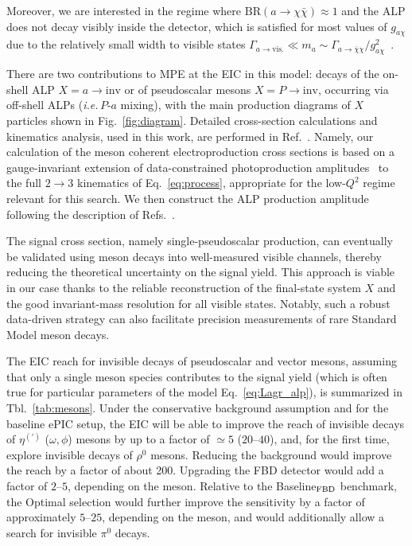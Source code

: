 \documentclass[aps,prd,preprintnumbers,superscriptaddress,nofootinbib,floatfix,twocolumn,notitlepage,reprint]{revtex4-2}
\newcommand{\BR}{\mathrm{BR}}
\newcommand{\ie}{\textit{i.e.}}
\begin{document}
Moreover, we are interested in the regime where $\BR(a \to \chi\bar{\chi})\approx 1$ and the ALP does not decay visibly inside the detector, which is satisfied for most values of $g_{a\chi}$ due to the relatively small width to visible states $\Gamma_{a\to\text{vis.}}\ll m_a\sim  \Gamma_{a\to\bar{\chi} \chi}/g_{a\chi}^2$~\cite{Aloni:2018vki,Ovchynnikov:2025gpx,Balkin:2025enj}.

There are two contributions to MPE at the EIC in this model: 
decays of the on-shell ALP $X = a\to \text{inv}$ or of pseudoscalar mesons $X = P\to \text{inv}$, occurring via off-shell ALPs (\ie $\, P$-$a$ mixing), with the main production diagrams of $X$ particles shown in Fig.~\ref{fig:diagram}. 
Detailed cross-section calculations and kinematics analysis, used in this work, are performed in Ref.~\cite{Balkin:2026whv}. Namely, our calculation of the meson coherent electroproduction cross sections is based on a gauge-invariant extension of data-constrained photoproduction amplitudes~\cite{Yu:2016zut,Yu:2017vvp,Kashevarov:2017vyl,Wang:2025rvr} to the full $2\to3$ kinematics of Eq.~\eqref{eq:process}, appropriate for the low-$Q^2$ regime relevant for this search. We then construct the ALP production amplitude following the description of Refs.~\cite{Aloni:2018vki,Ovchynnikov:2025gpx,Balkin:2025enj}. 

The signal cross section, namely single-pseudoscalar production, can eventually be validated using meson decays into well-measured visible channels, thereby reducing the theoretical uncertainty on the signal yield. 
This approach is viable in our case thanks to the reliable reconstruction of the final-state system $X$ and the good invariant-mass resolution for all visible states. 
Notably, such a robust data-driven strategy can also facilitate precision measurements of rare Standard Model meson decays.

The EIC reach for invisible decays of pseudoscalar and vector mesons, assuming that only a single meson species contributes to the signal yield (which is often true for particular parameters of the model Eq.~\eqref{eq:Lagr_alp}), is summarized in Tbl.~\ref{tab:mesons}. Under the conservative background assumption and for the baseline ePIC setup, the EIC will be able to improve the reach of invisible decays of $\eta^{(')}$ ($\omega,\phi$) mesons by up to a factor of $\simeq 5$ ($20$--$40$), and, for the first time, explore invisible decays of $\rho^{0}$ mesons.
Reducing the background would improve the reach by a factor of about 200. Upgrading the FBD detector would add a factor of $2$--$5$, depending on the meson.
Relative to the Baseline$_{\rm FBD}$ benchmark, the Optimal selection would further improve the sensitivity by a factor of approximately $5$--$25$, depending on the meson, and would additionally allow a search for invisible $\pi^{0}$ decays.
\end{document}
